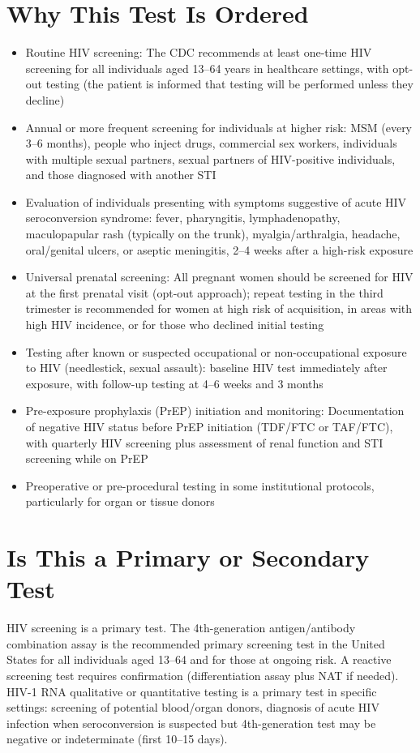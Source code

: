 \section*{Why This Test Is Ordered}
\begin{itemize}
  \item Routine HIV screening: The CDC recommends at least one-time HIV screening for all individuals aged 13--64 years in healthcare settings, with opt-out testing (the patient is informed that testing will be performed unless they decline)
  \item Annual or more frequent screening for individuals at higher risk: MSM (every 3--6 months), people who inject drugs, commercial sex workers, individuals with multiple sexual partners, sexual partners of HIV-positive individuals, and those diagnosed with another STI
  \item Evaluation of individuals presenting with symptoms suggestive of acute HIV seroconversion syndrome: fever, pharyngitis, lymphadenopathy, maculopapular rash (typically on the trunk), myalgia/arthralgia, headache, oral/genital ulcers, or aseptic meningitis, 2--4 weeks after a high-risk exposure
  \item Universal prenatal screening: All pregnant women should be screened for HIV at the first prenatal visit (opt-out approach); repeat testing in the third trimester is recommended for women at high risk of acquisition, in areas with high HIV incidence, or for those who declined initial testing
  \item Testing after known or suspected occupational or non-occupational exposure to HIV (needlestick, sexual assault): baseline HIV test immediately after exposure, with follow-up testing at 4--6 weeks and 3 months
  \item Pre-exposure prophylaxis (PrEP) initiation and monitoring: Documentation of negative HIV status before PrEP initiation (TDF/FTC or TAF/FTC), with quarterly HIV screening plus assessment of renal function and STI screening while on PrEP
  \item Preoperative or pre-procedural testing in some institutional protocols, particularly for organ or tissue donors
\end{itemize}

\section*{Is This a Primary or Secondary Test}
HIV screening is a primary test. The 4th-generation antigen/antibody combination assay is the recommended primary screening test in the United States for all individuals aged 13--64 and for those at ongoing risk. A reactive screening test requires confirmation (differentiation assay plus NAT if needed). HIV-1 RNA qualitative or quantitative testing is a primary test in specific settings: screening of potential blood/organ donors, diagnosis of acute HIV infection when seroconversion is suspected but 4th-generation test may be negative or indeterminate (first 10--15 days).

